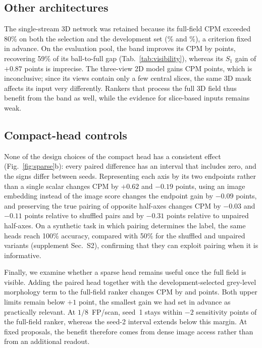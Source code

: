 \subsection{Other architectures}
\label{sec:breadth_result}

The single-stream 3D network was retained because its full-field CPM exceeded 80\% on both the selection and the development set (\SingleCheck\% and \SingleDev\%), a criterion fixed in advance. On the evaluation pool, the band improves its CPM by \SingleGain{} points, recovering 59\% of its ball-to-full gap (Tab.~\ref{tab:visibility}), whereas its $S_1$ gain of $+0.87$ points is imprecise. The three-view 2D model gains \TriGain{} CPM points, which is inconclusive; since its views contain only a few central slices, the same 3D mask affects its input very differently. Rankers that process the full 3D field thus benefit from the band as well, while the evidence for slice-based inputs remains weak.

\subsection{Compact-head controls}
\label{sec:compact_result}

None of the design choices of the compact head has a consistent effect (Fig.~\ref{fig:sparse}b): every paired difference has an interval that includes zero, and the signs differ between seeds. Representing each axis by its two endpoints rather than a single scalar changes CPM by $+0.62$ and $-0.19$ points, using an image embedding instead of the image score changes the endpoint gain by $-0.09$ points, and preserving the true pairing of opposite half-axes changes CPM by $-0.03$ and $-0.11$ points relative to shuffled pairs and by $-0.31$ points relative to unpaired half-axes. On a synthetic task in which pairing determines the label, the same heads reach 100\% accuracy, compared with 50\% for the shuffled and unpaired variants (supplement Sec.~S2), confirming that they can exploit pairing when it is informative.

Finally, we examine whether a sparse head remains useful once the full field is visible. Adding the paired head together with the development-selected grey-level morphology term to the full-field ranker changes CPM by \PracticalPrimary{} and \PracticalRepeat{} points. Both upper limits remain below $+1$ point, the smallest gain we had set in advance as practically relevant. At $1/8$~FP/scan, seed~1 stays within $-2$ sensitivity points of the full-field ranker, whereas the seed-2 interval extends below this margin. At fixed proposals, the benefit therefore comes from dense image access rather than from an additional readout.
